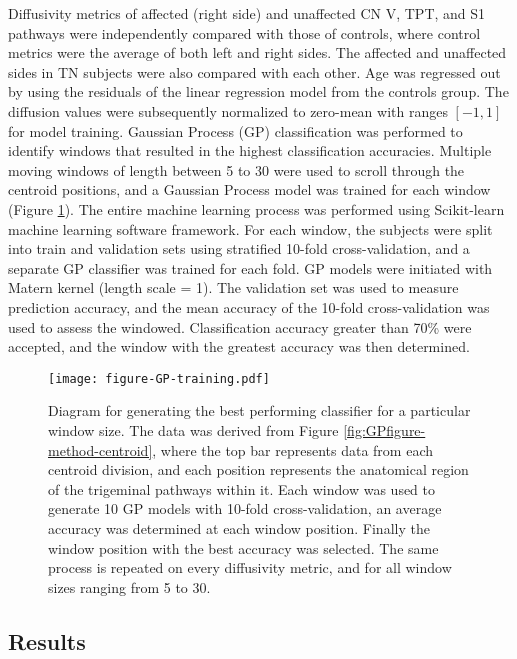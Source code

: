 Diffusivity metrics of affected (right side) and unaffected CN V, TPT, and S1 pathways were independently compared with those of controls, where control metrics were the average of both left and right sides. The affected and unaffected sides in TN subjects were also compared with each other. 
Age was regressed out by using the residuals of the linear regression model from the controls group. The diffusion values were subsequently normalized to zero-mean with ranges $[-1, 1]$ for model training. 
Gaussian Process (GP) classification was performed to identify windows that resulted in the highest classification accuracies. Multiple moving windows of length between 5 to 30 were used to scroll through the centroid positions, and a Gaussian Process model was trained for each window (Figure \ref{fig:GPfigure-gp-train}). The entire machine learning process was performed using Scikit-learn machine learning software framework.
For each window, the subjects were split into train and validation sets using stratified 10-fold cross-validation, and a separate GP classifier was trained for each fold. GP models were initiated with Matern kernel (length scale = 1). The validation set was used to measure prediction accuracy, and the mean accuracy of the 10-fold cross-validation was used to assess the windowed. Classification accuracy greater than 70\% were accepted, and the window with the greatest accuracy was then determined. 

\begin{figure}[ht]
\centering
\texttt{[image: figure-GP-training.pdf]}
\caption{Diagram for generating the best performing classifier for a particular window size. The data was derived from Figure \ref{fig:GPfigure-method-centroid}, where the top bar represents data from each centroid division, and each position represents the anatomical region of the trigeminal pathways within it. Each window was used to generate 10 GP models with 10-fold cross-validation, an average accuracy was determined at each window position. Finally the window position with the best accuracy was selected. The same process is repeated on every diffusivity metric, and for all window sizes ranging from 5 to 30. }
\label{fig:GPfigure-gp-train}
\end{figure}

\subsection{Results}
